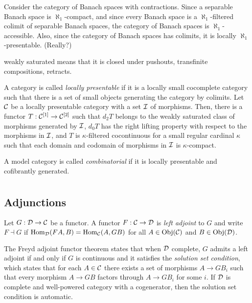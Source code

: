 \documentclass{../../large}
\begin{document}
Consider the category of Banach spaces with contractions.
Since a separable Banach space is $\aleph_1$-compact, and since every Banach space is a $\aleph_1$-filtered colimit of separable Banach spaces, the category of Banach spaces is $\aleph_1$-accessible.
Also, since the category of Banach spaces has colimits, it is locally $\aleph_1$-presentable.
(Really?)


weakly saturated means that it is closed under pushouts, transfinite compositions, retracts.


A category is called \emph{locally presentable} if it is a locally small cocomplete category such that there is a set of small objects generating the category by colimits.
Let $\mathcal{C}$ be a locally presentable category with a set $\mathcal{I}$ of morphisms.
Then, there is a functor $T:\mathcal{C}^{[1]}\to\mathcal{C}^{[2]}$ such that $d_2T$ belongs to the weakly saturated class of morphisms generated by $\mathcal{I}$, $d_0T$ has the right lifting property with respect to the morphisms in $\mathcal{I}$, and $T$ is $\kappa$-filtered cocontinuous for a small regular cardinal $\kappa$ such that each domain and codomain of morphisms in $\mathcal{I}$ is $\kappa$-compact.



A model category is called \emph{combinatorial} if it is locally presentable and cofibrantly generated.




\chapter{}
\section{Adjunctions}


Let $G:\mathcal{D}\to\mathcal{C}$ be a functor.
A functor $F:\mathcal{C}\to\mathcal{D}$ is \emph{left adjoint} to $G$ and write $F\dashv G$ if $\operatorname{Hom}_{\mathcal{D}}(FA,B)=\operatorname{Hom}_{\mathcal{C}}(A,GB)$ for all $A\in\operatorname{Obj}(\mathcal{C})$ and $B\in\operatorname{Obj}(\mathcal{D})$.

The Freyd adjoint functor theorem states that when $\mathcal{D}$ complete, $G$ admits a left adjoint if and only if $G$ is continuous and it satisfies the \emph{solution set condition}, which states that for each $A\in\mathcal{C}$ there exists a set of morphisms $A\to GB_i$ such that every morphism $A\to GB$ factors through $A\to GB_i$ for some $i$.
If $\mathcal{D}$ is complete and well-powered category with a cogenerator, then the solution set condition is automatic.
\end{document}
